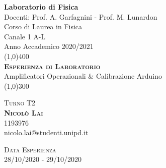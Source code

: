 \documentclass[a4paper,11pt]{article} %
\makeatletter
\newcommand{\labcourse}{Laboratorio di Fisica}
\newcommand{\teacher}{Docenti: Prof. A. Garfagnini - Prof. M. Lunardon}
\newcommand{\laurea}{Corso di Laurea in Fisica}
\newcommand{\channel}{Canale 1 A-L}
\newcommand{\academicyear}{Anno Accademico 2020/2021}
\newcommand{\labexp}{Esperienza di Laboratorio}
\newcommand{\exptitle}{Amplificatori Operazionali \& Calibrazione Arduino}
\newcommand{\turno}{Turno T2}
\newcommand{\name}{Nicolò Lai}
\newcommand{\matricola}{1193976}
\newcommand{\mail}{nicolo.lai@studenti.unipd.it}
\newcommand{\consegna}{Data Esperienza}
\newcommand{\data}{28/10/2020 - 29/10/2020}
\makeatother
\begin{document}

\def\sectionautorefname{Sezione} 
\def\subsectionautorefname{Sezione} 
\def\subsubsectionautorefname{Sezione}


\begin{titlepage}
	\begin{center}
		\Huge{\bfseries \labcourse}\\
			
		\LARGE \teacher \\
		\Large \laurea\\
		\Large \channel\\
		\Large \academicyear\\
		[1cm] 
		\line(1,0){400}\\
		[3.5cm]
			
		\textsc{\huge{\bfseries \labexp}}\\
		\huge{\exptitle}\\
		[2mm] \line(1,0){300}\\
		[10cm]
	\end{center}
	
	
	\begin{flushleft}
		\textsc{\Large \turno}\\
		[0.5cm] \textsc{\large {\bfseries \name}} \\ 
		\indent\large \matricola \\ 
		\indent\large \mail \\
	\end{flushleft}
		
					
	\begin{flushright}
			\textsc{\Large\consegna}\\
			\textsc{\large \data}					
	\end{flushright}
			
\end{titlepage}
\cleardoublepage


\end{document}
